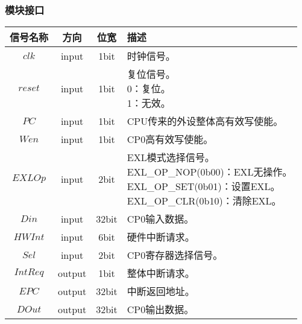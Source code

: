 \documentclass[main.tex]{subfiles}
\begin{document}
\subsubsection{模块接口}
\begin{center}
    \begin{tabular}[]{c c c l}
        \toprule
        信号名称 & 方向 & 位宽 & 描述 \\
        \midrule
        $clk$ & input & 1bit & 时钟信号。\\
        $reset$ & input & 1bit & \makecell[lt]{
            复位信号。\\
             0：复位。\\
             1：无效。
        } \\
        \midrule
        $PC$ & input & 1bit & CPU传来的外设整体高有效写使能。 \\
        $Wen$ & input & 1bit & CP0高有效写使能。 \\
        $EXLOp$ & input & 2bit & \makecell[lt]{
            EXL模式选择信号。\\
             EXL\_OP\_NOP(0b00)：EXL无操作。\\
             EXL\_OP\_SET(0b01)：设置EXL。\\
             EXL\_OP\_CLR(0b10)：清除EXL。
        } \\
        \midrule
        $Din$ & input & 32bit & CP0输入数据。 \\
        $HWInt$ & input & 6bit & 硬件中断请求。 \\
        $Sel$ & input & 2bit & CP0寄存器选择信号。\\
        $IntReq$ & output & 1bit & 整体中断请求。\\
        $EPC$ & output & 32bit & 中断返回地址。 \\
        $DOut$ & output & 32bit & CP0输出数据。 \\
        \bottomrule
    \end{tabular}
\end{center}

\clearpage
\end{document}
